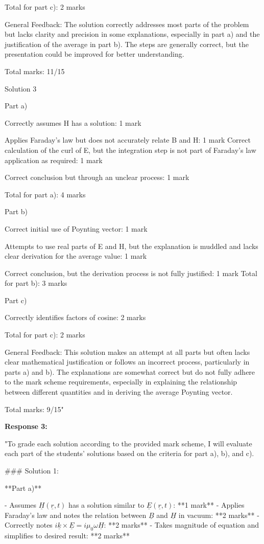 \documentclass[a4paper,11pt]{article}
\begin{document}
Total for part c): 2 marks

General Feedback: The solution correctly addresses most parts of the problem but lacks clarity and precision in some explanations, especially in part a) and the justification of the average in part b). The steps are generally correct, but the presentation could be improved for better understanding.

Total marks: 11/15

Solution 3

Part a)

Correctly assumes H has a solution: 1 mark

Applies Faraday's law but does not accurately relate B and H: 1 mark
Correct calculation of the curl of E, but the integration step is not part of Faraday's law application as required: 1 mark

Correct conclusion but through an unclear process: 1 mark

Total for part a): 4 marks

Part b)

Correct initial use of Poynting vector: 1 mark

Attempts to use real parts of E and H, but the explanation is muddled and lacks clear derivation for the average value: 1 mark

Correct conclusion, but the derivation process is not fully justified: 1 mark
Total for part b): 3 marks

Part c)

Correctly identifies factors of cosine: 2 marks

Total for part c): 2 marks

General Feedback: This solution makes an attempt at all parts but often lacks clear mathematical justification or follows an incorrect process, particularly in parts a) and b). The explanations are somewhat correct but do not fully adhere to the mark scheme requirements, especially in explaining the relationship between different quantities and in deriving the average Poynting vector.

Total marks: 9/15"

\textbf{Response 3:}

"To grade each solution according to the provided mark scheme, I will evaluate each part of the students' solutions based on the criteria for part a), b), and c).

### Solution 1:

**Part a)**

- Assumes \(\underline{H}(\underline{r}, t)\) has a solution similar to \(\underline{E}(\underline{r}, t)\): **1 mark**
- Applies Faraday's law and notes the relation between \(\underline{B}\) and \(\underline{H}\) in vacuum: **2 marks**
- Correctly notes \(i \underline{k} \times \underline{E} = i \mu_0 \omega \underline{H}\): **2 marks**
- Takes magnitude of equation and simplifies to desired result: **2 marks**
\end{document}
